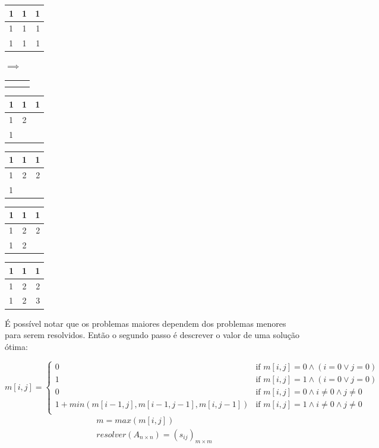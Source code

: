 \documentclass[10.9pt]{article}
\begin{document}
\begin{tabular}{ | l | c | r |}
  \hline
  1 & 1 & 1 \\ \hline
  1 & 1 & 1 \\ \hline
  1 & 1 & 1 \\ 
  \hline
\end{tabular}
$\implies$
\quad
\begin{tabular}{ | l | c | r |}
  \hline
   &  &  \\ \hline
   &  &  \\ \hline
   &  &  \\ 
  \hline
\end{tabular}
\quad
\begin{tabular}{ | l | c | r |}
  \hline
  1 & 1 & 1 \\ \hline
  1 & 2 &  \\ \hline
  1 &  &  \\ 
  \hline
\end{tabular}
\quad
\begin{tabular}{ | l | c | r |}
  \hline
  1 & 1 & 1 \\ \hline
  1 & 2 & 2 \\ \hline
  1 &  &  \\ 
  \hline
\end{tabular}
\quad
\begin{tabular}{ | l | c | r |}
  \hline
  1 & 1 & 1 \\ \hline
  1 & 2 & 2 \\ \hline
  1 & 2 &  \\ 
  \hline
\end{tabular}
\quad
\begin{tabular}{ | l | c | r |}
  \hline
  1 & 1 & 1 \\ \hline
  1 & 2 & 2 \\ \hline
  1 & 2 & 3 \\ 
  \hline
\end{tabular}

É possível notar que os problemas maiores dependem dos problemas menores para serem resolvidos. 
Então o segundo passo é descrever o valor de uma solução ótima:

\begin{equation}\label{eq:casodinamico}
m[i,j] = 
\begin{cases}
0 & \text{if $m[i,j] = 0 \land (i = 0 \lor j = 0) $ }\\
1 & \text{if $m[i,j] = 1 \land (i = 0 \lor j = 0) $ }\\
0 & \text{if $m[i,j] = 0 \land i \neq 0 \land j \neq 0 $ }\\
1+min(m[i-1,j],m[i-1,j-1],m[i,j-1]) & \text{if $m[i,j] = 1 \land i \neq 0 \land j \neq 0$}\\
\end{cases}
\end{equation}
\begin{equation}
\begin{aligned}
m = max(m[i,j])\\
resolver(A_{n\times n})=(s_{ij})_{m\times m}\\
\end{aligned}
\end{equation}
\end{document}

